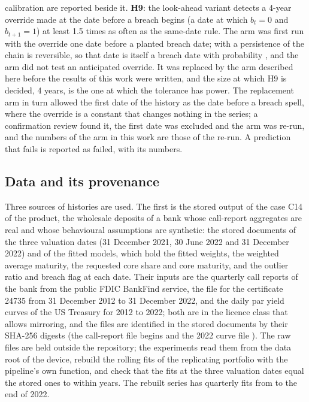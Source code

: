 calibration are reported beside it. \textbf{H9}: the look-ahead variant detects a 4-year override made at the date before a breach begins (a date at which $b_t=0$ and $b_{t+1}=1$) at least 1.5 times as often as the same-date rule. The arm was first run with the override one date before a planted breach date; with a persistence of \designStay{} the chain is reversible, so that date is itself a breach date with probability \designStay{}, and the arm did not test an anticipated override. It was replaced by the arm described here before the results of this work were written, and the size at which H9 is decided, 4 years, is the one at which the tolerance has power. The replacement arm in turn allowed the first date of the history as the date before a breach spell, where the override is a constant that changes nothing in the series; a confirmation review found it, the first date was excluded and the arm was re-run, and the numbers of the arm in this work are those of the re-run. A prediction that fails is reported as failed, with its numbers.

\subsection{Data and its provenance}
\label{sec:design-data}

Three sources of histories are used. The first is the stored output of the case C14 of the product, the wholesale deposits of a bank whose call-report aggregates are real and whose behavioural assumptions are synthetic: the stored documents of the three valuation dates (31 December 2021, 30 June 2022 and 31 December 2022) and of the fitted models, which hold the fitted weights, the weighted average maturity, the requested core share and core maturity, and the outlier ratio and breach flag at each date. Their inputs are the quarterly call reports of the bank from the public FDIC BankFind service, the file for the certificate 24735 from 31 December 2012 to 31 December 2022, and the daily par yield curves of the US Treasury for 2012 to 2022; both are in the licence class that allows mirroring, and the files are identified in the stored documents by their SHA-256 digests (the call-report file begins \shaFdic{} and the 2022 curve file \shaTreasury{}). The raw files are held outside the repository; the experiments read them from the data root of the device, rebuild the rolling fits of the replicating portfolio with the pipeline's own function, and check that the fits at the three valuation dates equal the stored ones to within \cOneFourRebuiltMaxDiff{} years. The rebuilt series has \realFits{} quarterly fits from \realFirstFit{} to the end of 2022.

